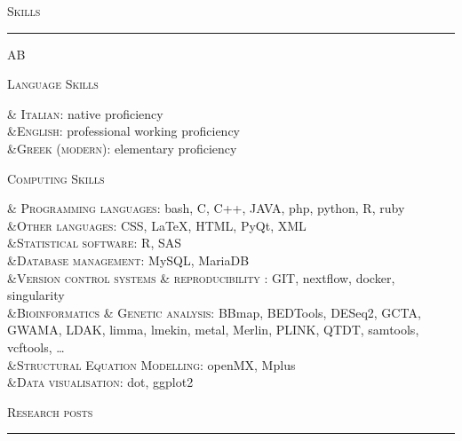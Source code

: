 \documentclass[a4paper,10pt]{article}
\newcommand{\mediumtitle}[1]{
	\vspace{0.2cm}
	{\noindent
	\Large \textsc{#1}\\[-2ex]
	\hrule
	\vspace{0.2cm}}
}
\newenvironment{doubletablelist}
{
	\vspace{-0.2cm}
	\begin{longtable}[!h]{AB}}{\end{longtable}
}
\newcommand{\dtlist}[2]{
\hspace{-3cm}
\noindent
	\begin{minipage}{0.22\textwidth}
	\begin{flushright}
	\textsc{#1}
	\end{flushright}
	\end{minipage}
	& #2\\[0.2cm]
}
\begin{document}

\mediumtitle{Skills}
\begin{doubletablelist}
	\dtlist{Language Skills}{\textsc{Italian}: native proficiency \\ 
							&\textsc{English}: professional working proficiency\\
							&\textsc{Greek (modern)}: elementary proficiency}
	\dtlist{Computing Skills}{\textsc{Programming languages}: bash, C, C++, JAVA, php, python, R, ruby\\
							&\textsc{Other languages}: CSS, \LaTeX, HTML, PyQt, XML\\
							&\textsc{Statistical software}: R, SAS\\
							&\textsc{Database management}: MySQL, MariaDB\\
							&\textsc{Version control systems \& reproducibility }: GIT, nextflow, docker, singularity\\
							&\textsc{Bioinformatics \& Genetic analysis}: BBmap, BEDTools, DESeq2, GCTA, GWAMA, LDAK, limma, lmekin, metal, Merlin, PLINK, QTDT, samtools, vcftools, \dots\\
							&\textsc{Structural Equation Modelling}: openMX, Mplus\\
							&\textsc{Data visualisation}: dot, ggplot2}
\end{doubletablelist}

\newpage


\mediumtitle{Research posts}
\end{document}
